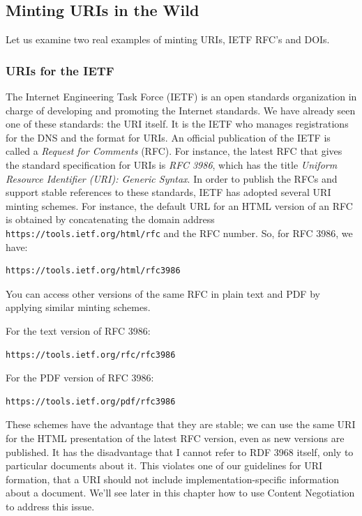 \subsection{Minting URIs in the Wild}
Let us examine two real examples of minting URIs, IETF RFC's and DOIs. 

\subsubsection{URIs for the IETF}
The Internet Engineering Task Force (IETF) is an open
standards organization in charge of developing and promoting the
Internet standards. We have already seen   one of these standards: the URI itself.  It is the IETF who manages registrations for the DNS and the format for URIs.
An official publication of the IETF is   called a \emph{Request
for Comments} (RFC). For instance, the latest RFC that gives the standard specification for
URIs is
\emph{RFC 3986}, which has the title  \emph{Uniform Resource Identifier (URI): Generic Syntax}.
In order to publish the RFCs and support stable references to these
standards, IETF has adopted several URI minting schemes. For instance,
the default URL for an HTML version of an RFC is obtained by concatenating the
domain address \texttt{https://tools.ietf.org/html/rfc} and the RFC number. So, for RFC 3986, we have:

\begin{lstlisting}
https://tools.ietf.org/html/rfc3986
\end{lstlisting}


You can access other versions of the same RFC in plain text and PDF by applying
similar  minting schemes.

For the text version of RFC 3986:
\begin{lstlisting}
https://tools.ietf.org/rfc/rfc3986
\end{lstlisting}

For the PDF version of RFC 3986:
\begin{lstlisting}
https://tools.ietf.org/pdf/rfc3986
\end{lstlisting}

These schemes have the advantage that they are stable; we can use the same URI
for the HTML presentation of the latest RFC version, even as new versions are published.  It has the disadvantage that I cannot refer to RDF 3968 itself, only to particular documents about it.  This violates one of our guidelines for URI formation, that a URI should not include implementation-specific information about a document. We'll see later in this chapter how to use Content Negotiation to address this issue. 

